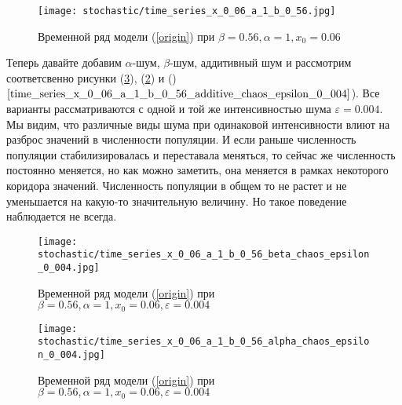         \begin{figure}
            \centering
            \texttt{[image: stochastic/time\_series\_x\_0\_06\_a\_1\_b\_0\_56.jpg]}

            \captionsetup{justification=centering}
            \caption{Временной ряд модели (\ref{origin}) при \(\beta = 0.56, \alpha = 1, x_0 = 0.06\)}
            \label{time_series_x_0_06_a_1_b_0_56}
        \end{figure}

        Теперь давайте добавим \(\alpha\)-шум, \(\beta\)-шум, аддитивный шум и рассмотрим соответсвенно рисунки (\ref{time_series_x_0_06_a_1_b_0_56_alpha_chaos_epsilon_0_004}), (\ref{time_series_x_0_06_a_1_b_0_56_beta_chaos_epsilon_0_004}) и ()\(\ref{time_series_x_0_06_a_1_b_0_56_additive_chaos_epsilon_0_004}\)). Все варианты рассматриваются с одной и той же интенсивностью шума \(\varepsilon = 0.004\). Мы видим, что различные виды шума при одинаковой интенсивности влиют на разброс значений в численности популяции. И если раньше численность популяции стабилизировалась и переставала меняться, то сейчас же численность постоянно меняется, но как можно заметить, она меняется в рамках некоторого коридора значений. Численность популяции в общем то не растет и не уменьшается на какую-то значительную величину. Но такое поведение наблюдается не всегда.

        \begin{figure}
            \centering
            \texttt{[image: stochastic/time\_series\_x\_0\_06\_a\_1\_b\_0\_56\_beta\_chaos\_epsilon\_0\_004.jpg]}
        
            \captionsetup{justification=centering}
            \caption{Временной ряд модели (\ref{origin}) при \(\beta = 0.56, \alpha = 1, x_0 = 0.06, \varepsilon = 0.004\)}
            \label{time_series_x_0_06_a_1_b_0_56_beta_chaos_epsilon_0_004}
        \end{figure}

        \begin{figure}
            \centering
            \texttt{[image: stochastic/time\_series\_x\_0\_06\_a\_1\_b\_0\_56\_alpha\_chaos\_epsilon\_0\_004.jpg]}
        
            \captionsetup{justification=centering}
            \caption{Временной ряд модели (\ref{origin}) при \(\beta = 0.56, \alpha = 1, x_0 = 0.06, \varepsilon = 0.004\)}
            \label{time_series_x_0_06_a_1_b_0_56_alpha_chaos_epsilon_0_004}
        \end{figure}

